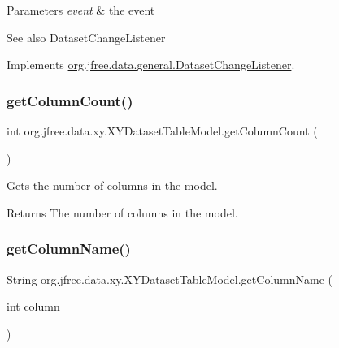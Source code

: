 \begin{DoxyParams}{Parameters}
{\em event} & the event\\
\hline
\end{DoxyParams}
\begin{DoxySeeAlso}{See also}
Dataset\+Change\+Listener 
\end{DoxySeeAlso}


Implements \mbox{\hyperlink{interfaceorg_1_1jfree_1_1data_1_1general_1_1_dataset_change_listener_a26ca53969f0dfa539f52e846a3cd72fe}{org.\+jfree.\+data.\+general.\+Dataset\+Change\+Listener}}.

\mbox{\label{classorg_1_1jfree_1_1data_1_1xy_1_1_x_y_dataset_table_model_a8cc3c4f508270120633efa49469abfaa}} 
\subsubsection{\texorpdfstring{get\+Column\+Count()}{getColumnCount()}}
{\footnotesize\ttfamily int org.\+jfree.\+data.\+xy.\+X\+Y\+Dataset\+Table\+Model.\+get\+Column\+Count (\begin{DoxyParamCaption}{ }\end{DoxyParamCaption})}

Gets the number of columns in the model.

\begin{DoxyReturn}{Returns}
The number of columns in the model. 
\end{DoxyReturn}
\mbox{\label{classorg_1_1jfree_1_1data_1_1xy_1_1_x_y_dataset_table_model_a7ef10accb4b33dcfc00b3284cdcf4a5a}} 
\subsubsection{\texorpdfstring{get\+Column\+Name()}{getColumnName()}}
{\footnotesize\ttfamily String org.\+jfree.\+data.\+xy.\+X\+Y\+Dataset\+Table\+Model.\+get\+Column\+Name (\begin{DoxyParamCaption}\item[{int}]{column }\end{DoxyParamCaption})}

